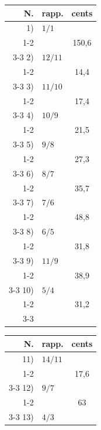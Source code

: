\begin{center}\small
\setlength{\tabcolsep}{4pt}
\begin{tabular}[t]{r @{\,} l c}
\toprule
N. & rapp. & cents \\
\midrule
  1) & $1/1$ & \\
  \cmidrule(lr){1-2}
     &       & 150,6 \\
  \cmidrule(lr){3-3}
  2) & $12/11$ & \\
  \cmidrule(lr){1-2}
     &       & 14,4 \\
  \cmidrule(lr){3-3}
  3) & $11/10$ & \\
  \cmidrule(lr){1-2}
     &       & 17,4 \\
  \cmidrule(lr){3-3}
  4) & $10/9$ & \\
  \cmidrule(lr){1-2}
     &       & 21,5 \\
  \cmidrule(lr){3-3}
  5) & $9/8$ & \\
  \cmidrule(lr){1-2}
     &       & 27,3 \\
  \cmidrule(lr){3-3}
  6) & $8/7$ & \\
  \cmidrule(lr){1-2}
     &       & 35,7 \\
  \cmidrule(lr){3-3}
  7) & $7/6$ & \\
  \cmidrule(lr){1-2}
     &       & 48,8 \\
  \cmidrule(lr){3-3}
  8) & $6/5$ & \\
  \cmidrule(lr){1-2}
     &       & 31,8 \\
  \cmidrule(lr){3-3}
  9) & $11/9$ & \\
  \cmidrule(lr){1-2}
     &       & 38,9 \\
  \cmidrule(lr){3-3}
  10) & $5/4$ & \\
  \cmidrule(lr){1-2}
     &       & 31,2 \\
  \cmidrule(lr){3-3}
\bottomrule
\end{tabular}
\qquad
\begin{tabular}[t]{r @{\,} l c}
\toprule
N. & rapp. & cents \\
\midrule
  11) & $14/11$ & \\
  \cmidrule(lr){1-2}
     &       & 17,6 \\
  \cmidrule(lr){3-3}
  12) & $9/7$ & \\
  \cmidrule(lr){1-2}
     &       & 63 \\
  \cmidrule(lr){3-3}
  13) & $4/3$ & \\

\end{tabular}
\end{center}
